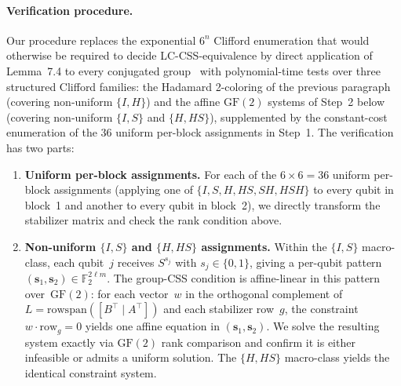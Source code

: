 \documentclass[aps,prxquantum,twocolumn,superscriptaddress,nofootinbib]{revtex4-2}
\newcommand{\FF}{\ensuremath{\mathbb{F}}}
\begin{document}
\paragraph{Verification procedure.}
Our procedure replaces the exponential $6^n$ Clifford enumeration that would otherwise be required to decide LC-CSS-equivalence by direct application of Lemma~7.4 to every conjugated group~\cite[\S7.2]{cross2025small} with polynomial-time tests over three structured Clifford families: the Hadamard 2-coloring of the previous paragraph (covering non-uniform $\{I,H\}$) and the affine $\mathrm{GF}(2)$ systems of Step~2 below (covering non-uniform $\{I,S\}$ and $\{H,HS\}$), supplemented by the constant-cost enumeration of the 36 uniform per-block assignments in Step~1.
The verification has two parts:

\begin{enumerate}
\item \textbf{Uniform per-block assignments.}
For each of the $6 \times 6 = 36$ uniform per-block assignments (applying one of $\{I, S, H, HS, SH, HSH\}$ to every qubit in block~1 and another to every qubit in block~2), we directly transform the stabilizer matrix and check the rank condition above.

\item \textbf{Non-uniform $\{I,S\}$ and $\{H,HS\}$ assignments.}
Within the $\{I,S\}$ macro-class, each qubit~$j$ receives $S^{s_j}$ with $s_j \in \{0,1\}$, giving a per-qubit pattern $(\mathbf{s}_1, \mathbf{s}_2) \in \FF_2^{2\ell m}$.
The group-CSS condition is affine-linear in this pattern over~$\mathrm{GF}(2)$: for each vector~$w$ in the orthogonal complement of $L = \mathrm{rowspan}([B^\top \mid A^\top])$ and each stabilizer row~$g$, the constraint $w \cdot \mathrm{row}_g = 0$ yields one affine equation in $(\mathbf{s}_1, \mathbf{s}_2)$.
We solve the resulting system exactly via $\mathrm{GF}(2)$ rank comparison and confirm it is either infeasible or admits a uniform solution.
The $\{H,HS\}$ macro-class yields the identical constraint system.
\end{enumerate}
\end{document}
